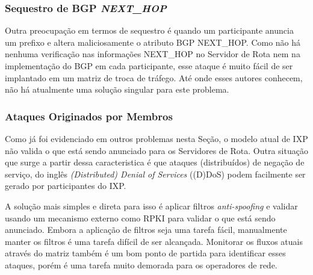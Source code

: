 \documentclass[12pt]{article}
\begin{document}
\subsubsection{Sequestro de BGP \textit{NEXT\_HOP}}
Outra preocupação em termos de sequestro é quando um participante anuncia um prefixo e altera maliciosamente o atributo BGP NEXT\_HOP. Como não há nenhuma verificação nas informações NEXT\_HOP no Servidor de Rota nem na implementação do BGP em cada participante, esse ataque é muito fácil de ser implantado em um matriz de troca de tráfego. Até onde esses autores conhecem, não há atualmente uma solução singular para este problema.


\subsubsection{Ataques Originados por Membros}
Como já foi evidenciado em outros problemas nesta Seção, o modelo atual de IXP não valida o que está sendo anunciado para os Servidores de Rota. Outra situação que surge a partir dessa caracteristica é que ataques (distribuídos) de negação de serviço, do inglês \textit{(Distributed) Denial of Services} ((D)DoS) podem facilmente ser gerado por participantes do IXP.


A solução mais simples e direta para isso é aplicar filtros \textit{anti-spoofing} e validar usando um mecanismo externo como RPKI para validar o que está sendo anunciado. Embora a aplicação de filtros seja uma tarefa fácil, manualmente manter os filtros é uma tarefa difícil de ser alcançada. Monitorar os fluxos atuais através do matriz também é um bom ponto de partida para identificar esses ataques, porém é uma tarefa muito demorada para os operadores de rede.

\end{document}
